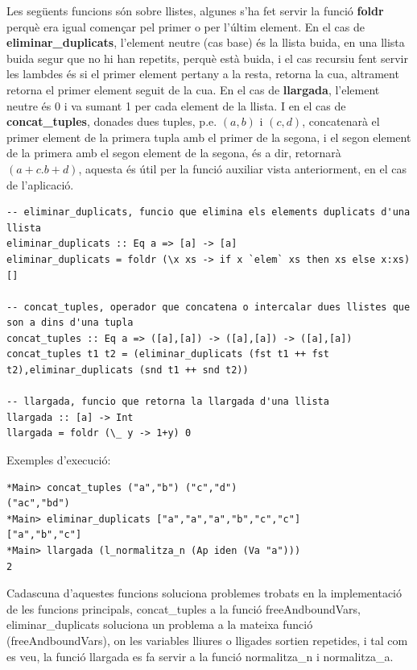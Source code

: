 \documentclass[10pt,a4paper]{article}
\begin{document}
Les següents funcions són sobre llistes, algunes s'ha fet servir la funció \textbf{foldr} perquè era igual començar pel primer o per l'últim element. En el cas de \textbf{eliminar\_duplicats}, l'element neutre (cas base) és la llista buida, en una llista buida segur que no hi han repetits, perquè està buida, i el cas recursiu fent servir les lambdes és si el primer element pertany a la resta, retorna la cua, altrament retorna el primer element seguit de la cua. En el cas de \textbf{llargada}, l'element neutre és 0 i va sumant 1 per cada element de la llista. I en el cas de \textbf{concat\_tuples}, donades dues tuples, p.e. $(a,b)$ i $(c,d)$, concatenarà el primer element de la primera tupla amb el primer de la segona, i el segon element de la primera amb el segon element de la segona, és a dir, retornarà $(a+c.b+d)$, aquesta és útil per la funció auxiliar vista anteriorment, en el cas de l'aplicació.

\lstset{language=Haskell, breaklines=true, basicstyle=\footnotesize}
\begin{lstlisting}[frame=mystyle]
-- eliminar_duplicats, funcio que elimina els elements duplicats d'una llista
eliminar_duplicats :: Eq a => [a] -> [a]
eliminar_duplicats = foldr (\x xs -> if x `elem` xs then xs else x:xs) []

-- concat_tuples, operador que concatena o intercalar dues llistes que son a dins d'una tupla
concat_tuples :: Eq a => ([a],[a]) -> ([a],[a]) -> ([a],[a])
concat_tuples t1 t2 = (eliminar_duplicats (fst t1 ++ fst t2),eliminar_duplicats (snd t1 ++ snd t2))

-- llargada, funcio que retorna la llargada d'una llista
llargada :: [a] -> Int
llargada = foldr (\_ y -> 1+y) 0
\end{lstlisting}

Exemples d'execució:

\lstset{language=Haskell, breaklines=true, basicstyle=\footnotesize}
\begin{lstlisting}[frame=mystyle]
*Main> concat_tuples ("a","b") ("c","d")
("ac","bd")
*Main> eliminar_duplicats ["a","a","a","b","c","c"]
["a","b","c"]
*Main> llargada (l_normalitza_n (Ap iden (Va "a")))
2
\end{lstlisting}

Cadascuna d'aquestes funcions soluciona problemes trobats en la implementació de les funcions principals, concat\_tuples a la funció freeAndboundVars, eliminar\_duplicats soluciona un problema a la mateixa funció (freeAndboundVars), on les variables lliures o lligades sortien repetides, i tal com es veu, la funció llargada es fa servir a la funció normalitza\_n i normalitza\_a.
\end{document}
